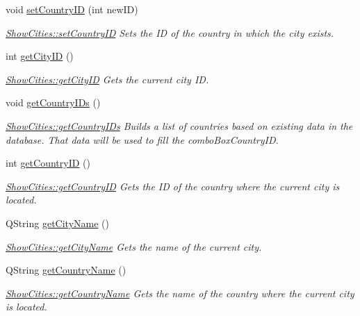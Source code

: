 \begin{DoxyCompactItemize}
void \mbox{\hyperlink{class_show_cities_a853a958ebc2c0d42d872c237d431fe25}{set\+Country\+ID}} (int new\+ID)
\begin{DoxyCompactList}\small\item\em \mbox{\hyperlink{class_show_cities_a853a958ebc2c0d42d872c237d431fe25}{Show\+Cities\+::set\+Country\+ID}} Sets the ID of the country in which the city exists. \end{DoxyCompactList}\item 
int \mbox{\hyperlink{class_show_cities_ac81b38d6862643619d07f82fe12b5c02}{get\+City\+ID}} ()
\begin{DoxyCompactList}\small\item\em \mbox{\hyperlink{class_show_cities_ac81b38d6862643619d07f82fe12b5c02}{Show\+Cities\+::get\+City\+ID}} Gets the current city ID. \end{DoxyCompactList}\item 
\mbox{\label{class_show_cities_a8fa42e8a5b12579cd04ae2a8ee4a9370}} 
void \mbox{\hyperlink{class_show_cities_a8fa42e8a5b12579cd04ae2a8ee4a9370}{get\+Country\+I\+Ds}} ()
\begin{DoxyCompactList}\small\item\em \mbox{\hyperlink{class_show_cities_a8fa42e8a5b12579cd04ae2a8ee4a9370}{Show\+Cities\+::get\+Country\+I\+Ds}} Builds a list of countries based on existing data in the database. That data will be used to fill the combo\+Box\+Country\+ID. \end{DoxyCompactList}\item 
int \mbox{\hyperlink{class_show_cities_a8f66380734928e926a732a0088c1d998}{get\+Country\+ID}} ()
\begin{DoxyCompactList}\small\item\em \mbox{\hyperlink{class_show_cities_a8f66380734928e926a732a0088c1d998}{Show\+Cities\+::get\+Country\+ID}} Gets the ID of the country where the current city is located. \end{DoxyCompactList}\item 
Q\+String \mbox{\hyperlink{class_show_cities_a3640b91c66939d0070c3dd6f5b9eb93c}{get\+City\+Name}} ()
\begin{DoxyCompactList}\small\item\em \mbox{\hyperlink{class_show_cities_a3640b91c66939d0070c3dd6f5b9eb93c}{Show\+Cities\+::get\+City\+Name}} Gets the name of the current city. \end{DoxyCompactList}\item 
Q\+String \mbox{\hyperlink{class_show_cities_a93cf32e7ef19a182d0022c9c888392aa}{get\+Country\+Name}} ()
\begin{DoxyCompactList}\small\item\em \mbox{\hyperlink{class_show_cities_a93cf32e7ef19a182d0022c9c888392aa}{Show\+Cities\+::get\+Country\+Name}} Gets the name of the country where the current city is located. \end{DoxyCompactList}\end{DoxyCompactItemize}


